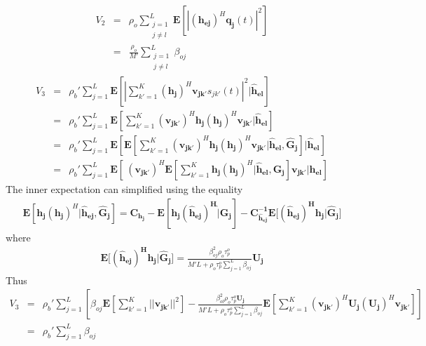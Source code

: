 \documentclass[10pt, a4paper, twoside,fleqn]{article}
\begin{document}
\begin{eqnarray}\label{eqn:otv2}
	V_2 &=& \rho_o \sum_{\substack{j=1 \\ j \neq l}}^{L} \pmb{E}[|(\pmb{h_{ej}})^H\pmb{q_j}(t)|^2] \nonumber \\
            &=& \frac{\rho_o}{M'} \sum_{\substack{j=1 \\ j\neq l}}^{L} \beta_{oj}
\end{eqnarray}
\begin{eqnarray}
	V_3 &=& \rho_b' \sum_{j=1}^{L} \pmb{E}\left[\left|\sum_{k'=1}^{K} (\pmb{h_j})^H \pmb{v_{jk'}}s_{jk'}(t) \right|^2 | \pmb{\hat h_{el}} \right] \nonumber \\
            &=& \rho_b' \sum_{j=1}^{L} \pmb{E}\left[\sum_{k'=1}^{K} (\pmb{v_{jk'}})^H \pmb{h_j}  (\pmb{h_j})^H \pmb{v_{jk'}}| \pmb{\hat h_{el}} \right] \nonumber \\
            &=& \rho_b' \sum_{j=1}^{L} \pmb{E}\left[\pmb{E}\left[\sum_{k'=1}^{K} (\pmb{v_{jk'}})^H \pmb{h_j}  (\pmb{h_j})^H \pmb{v_{jk'}}| \pmb{\hat h_{el}},  \pmb{\hat G_{j}} \right] | \pmb{\hat h_{el}}\right] \nonumber \\
            &=& \rho_b' \sum_{j=1}^{L} \pmb{E}\left[\ (\pmb{v_{jk'}})^H \pmb{E}\left[\sum_{k'=1}^{K} \pmb{h_j}  (\pmb{h_j})^H | \pmb{\hat h_{el}},  \pmb{\hat G_{j}} \right] \pmb{v_{jk'}}| \pmb{\hat h_{el}}\right]
\end{eqnarray}
The inner expectation can simplified using the equality \cite{bib:rmtBook}
\begin{eqnarray}
	\pmb{E}[\pmb{h_j}(\pmb{h_j})^H|\pmb{\hat h_{ej}}, \pmb{\hat G_{j}}] = \pmb{C_{h_j}}-\pmb{E[h_j (\hat h_{ej})^H \hat| G_{j}] - C_{\hat h_{ej}}^{-1}E[(\hat h_{ej})^H h_j| \hat G_{j}}]
\end{eqnarray}
where
\begin{eqnarray}
	\pmb{E[(\hat h_{ej})^H h_j| \hat G_{j}}] = \frac{\beta_{oj}^{2}\rho_o\tau_p^o}{M'L+\rho_o\tau_p^o\sum\limits_{j=1}^{L}\beta_{oj}}\pmb{U_j}
\end{eqnarray}
Thus
\begin{eqnarray}\label{eqn:otv3}
	V_3 &=& \rho_b' \sum_{j=1}^{L} \left[ \beta_{oj} \pmb{E}[\sum_{k'=1}^{K}||\pmb{v_{jk'}}||^2]
					- \frac{\beta_{ol}^{2}\rho_o\tau_p^o\pmb{U_j}}{M'L+\rho_o\tau_p^o\sum\limits_{j=1}^{L}\beta_{oj}} \pmb{E}\left[\sum_{k'=1}^{K} (\pmb{v_{jk'}})^H \pmb{U_j}  (\pmb{U_j})^H \pmb{v_{jk'}}\right]\right] \nonumber \\
	    &=& \rho_b'\sum_{j=1}^{L}\beta_{oj}
\end{eqnarray}
\end{document}
